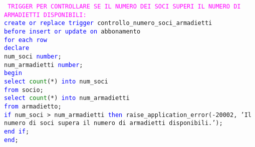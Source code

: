 \documentclass{article}
\begin{document}
    \begin{flushleft}
        \texttt{
        \textcolor{magenta}{TRIGGER PER CONTROLLARE SE IL NUMERO DEI SOCI SUPERI IL NUMERO DI ARMADIETTI \hspace*{0.5em}DISPONIBILI:} \\
        \hspace*{2em} \textcolor{blue}{create or replace trigger} controllo\_numero\_soci\_armadietti \\
        \hspace*{2em} \textcolor{blue}{before insert or update on} abbonamento \\
        \hspace*{2em} \textcolor{blue}{for each row} \\
        \hspace*{2em} \textcolor{blue}{declare} \\
            \hspace*{4em} num\_soci \textcolor{blue}{number}; \\
            \hspace*{4em} num\_armadietti \textcolor{blue}{number}; \\
        \hspace*{2em} \textcolor{blue}{begin} \\
        \hspace*{4em} \textcolor{blue}{select} \textcolor{green}{count}(*) \textcolor{blue}{into} num\_soci \\
        \hspace*{4em} \textcolor{blue}{from} socio; \\
        \hspace*{4em} \textcolor{blue}{select} \textcolor{green}{count}(*) \textcolor{blue}{into} num\_armadietti \\
        \hspace*{4em} \textcolor{blue}{from} armadietto; \\
        \hspace*{4.4em}\textcolor{blue}{if} num\_soci > num\_armadietti \textcolor{blue}{then}
            raise\_application\_error(-20002, 'Il \hspace*{4.4em}numero di soci supera il numero di armadietti disponibili.'); \\
        \hspace*{4em} \textcolor{blue}{end if}; \\
        \hspace*{2em} \textcolor{blue}{end}; \\}
    \end{flushleft}
\end{document}
